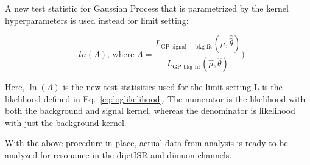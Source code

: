     A new test statistic for Gaussian Process that is parametrized by the kernel hyperparameters is used instead for limit setting:

\begin{equation}
    -ln(\Lambda) \textrm{, where }\Lambda= \frac{L_{\textrm{GP signal + bkg fit}}(\mu, \hat{\hat{\theta}})}{L_{\textrm{GP bkg fit}}(\hat{\mu}, \hat{\theta})})
\label{eq:gplikelihood}
\end{equation}

Here, $\ln(\Lambda)$ is the new test statisitics used for the limit setting L is the likelihood defined in Eq.~\ref{eq:loglikelihood}. The numerator is the likelihood with both the background and signal kernel, whereas the denominator is likelihood with just the background kernel. 

With the above procedure in place, actual data from analysis is ready to be analyzed for resonance in the dijetISR and dimuon channels.


